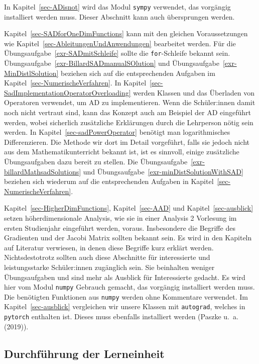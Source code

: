 \documentclass[
  a4paper,
  DIV=11]{scrreprt}
\theoremstyle{definition}
\theoremstyle{definition}
\theoremstyle{remark}
\begin{document}
In Kapitel~\ref{sec-ADisnot} wird das Modul \texttt{sympy} verwendet,
das vorgängig installiert werden muss. Dieser Abschnitt kann auch
übersprungen werden.

Kapitel~\ref{sec-SADforOneDimFunctions} kann mit den gleichen
Voraussetzungen wie Kapitel~\ref{sec-AbleitungenUndAnwendungen}
bearbeitet werden. Für die Übungsaufgabe~\ref{exr-SADmitSchleife} sollte
die \texttt{for}-Schleife bekannt sein.
Übungsaufgabe~\ref{exr-BillardSADmanualSOlution} und
Übungsaufgabe~\ref{exr-MinDistlSolution} beziehen sich auf die
entsprechenden Aufgaben im Kapitel~\ref{sec-NumerischeVerfahren}. In
Kapitel~\ref{sec-SadImplementationOperatorOverloading} werden Klassen
und das Überladen von Operatoren verwendet, um AD zu implementieren.
Wenn die Schüler:innen damit noch nicht vertraut sind, kann das Konzept
auch am Beispiel der AD eingeführt werden, wobei sicherlich zusätzliche
Erklärungen durch die Lehrperson nötig sein werden. In
Kapitel~\ref{sec-sadPowerOperator} benötigt man logarithmisches
Differenzieren. Die Methode wir dort im Detail vorgeführt, falls sie
jedoch nicht aus dem Mathematikunterricht bekannt ist, ist es sinnvoll,
einige zusätzliche Übungsaufgaben dazu bereit zu stellen. Die
Übungsaufgabe~\ref{exr-billardMathsadSolutions} und
Übungsaufgabe~\ref{exr-minDistSolutionWithSAD} beziehen sich wiederum
auf die entsprechenden Aufgaben in
Kapitel~\ref{sec-NumerischeVerfahren}.

Kapitel~\ref{sec-HigherDimFunctions}, Kapitel~\ref{sec-AAD} und
Kapitel~\ref{sec-ausblick} setzen höherdimensionale Analysis, wie sie in
einer Analysis 2 Vorlesung im ersten Studienjahr eingeführt werden,
voraus. Insbesondere die Begriffe des Gradienten und der Jacobi Matrix
sollten bekannt sein. Es wird in den Kapiteln auf Literatur verwiesen,
in denen diese Begriffe kurz erklärt werden. Nichtsdestotrotz sollten
auch diese Abschnitte für interessierte und leistungsstarke
Schüler:innen zugänglich sein. Sie beinhalten weniger Übungsaufgaben und
sind mehr als Ausblick für Interessierte gedacht. Es wird hier vom Modul
\texttt{numpy} Gebrauch gemacht, das vorgängig installiert werden muss.
Die benötigten Funktionen aus \texttt{numpy} werden ohne Kommentare
verwendet. Im Kapitel~\ref{sec-ausblick} vergleichen wir unsere Klassen
mit \texttt{autograd}, welches in \texttt{pytorch} enthalten ist. Dieses
muss ebenfalls installiert werden (Paszke u.~a. (2019)).

\hypertarget{durchfuxfchrung-der-lerneinheit}{%
\subsection{Durchführung der
Lerneinheit}\label{durchfuxfchrung-der-lerneinheit}}
\end{document}
